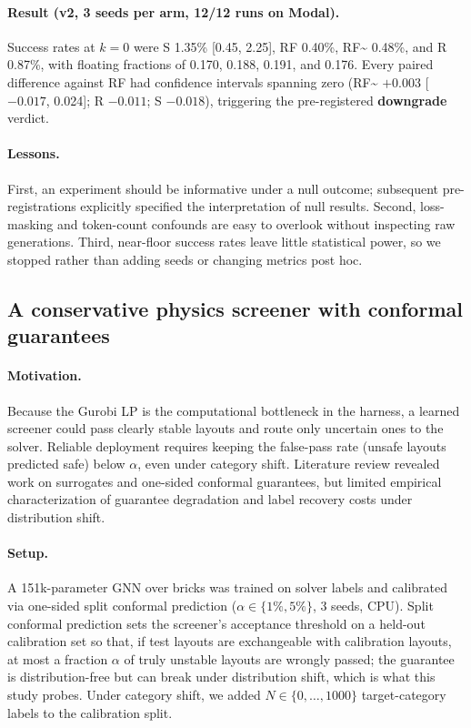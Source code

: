 \documentclass{article}
\begin{document}
\paragraph{Result (v2, 3 seeds per arm, 12/12 runs on Modal).} Success rates at $k{=}0$ were S 1.35\% [0.45, 2.25], RF 0.40\%, RF\~{} 0.48\%, and R 0.87\%, with floating fractions of 0.170, 0.188, 0.191, and 0.176. Every paired difference against RF had confidence intervals spanning zero (RF\~{} $+0.003$ [$-0.017$, 0.024]; R $-0.011$; S $-0.018$), triggering the pre-registered \textbf{downgrade} verdict.

\paragraph{Lessons.} First, an experiment should be informative under a null outcome; subsequent pre-registrations explicitly specified the interpretation of null results. Second, loss-masking and token-count confounds are easy to overlook without inspecting raw generations. Third, near-floor success rates leave little statistical power, so we stopped rather than adding seeds or changing metrics post hoc.

\subsection{A conservative physics screener with conformal guarantees}
\label{ex:screen}
\paragraph{Motivation.} Because the Gurobi LP is the computational bottleneck in the harness, a learned screener could pass clearly stable layouts and route only uncertain ones to the solver. Reliable deployment requires keeping the false-pass rate (unsafe layouts predicted safe) below $\alpha$, even under category shift. Literature review revealed work on surrogates and one-sided conformal guarantees, but limited empirical characterization of guarantee degradation and label recovery costs under distribution shift.

\paragraph{Setup.} A 151k-parameter GNN over bricks was trained on solver labels and calibrated via one-sided split conformal prediction ($\alpha\in\{1\%,5\%\}$, 3 seeds, CPU). Split conformal prediction sets the screener's acceptance threshold on a held-out calibration set so that, if test layouts are exchangeable with calibration layouts, at most a fraction $\alpha$ of truly unstable layouts are wrongly passed; the guarantee is distribution-free but can break under distribution shift, which is what this study probes. Under category shift, we added $N\in\{0,\dots,1000\}$ target-category labels to the calibration split.
\end{document}
